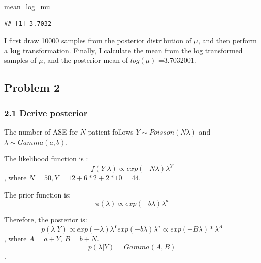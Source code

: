 \documentclass[
]{article}
\newenvironment{Shaded}{\begin{snugshade}}{\end{snugshade}}
\newcommand{\NormalTok}[1]{#1}
\begin{document}
\begin{Shaded}
\begin{Highlighting}[]
\NormalTok{mean_log_mu}
\end{Highlighting}
\end{Shaded}

\begin{verbatim}
## [1] 3.7032
\end{verbatim}

I first draw 10000 samples from the posterior distribution of \(\mu\),
and then perform a \textbf{log} transformation. Finally, I calculate the
mean from the log transformed samples of \(\mu\), and the posterior mean
of \(log(\mu)\) =3.7032001.

\hypertarget{problem-2}{%
\subsection{Problem 2}\label{problem-2}}

\hypertarget{derive-posterior}{%
\subsubsection{2.1 Derive posterior}\label{derive-posterior}}

The number of ASE for \(N\) patient follows
\(Y \sim Poisson(N \lambda)\) and \(\lambda \sim Gamma(a, b)\).

The likelihood function is :
\[f(Y|\lambda) \propto exp(-N \lambda) \lambda^Y\], where
\(N = 50, Y = 12 + 6*2 + 2 * 10 = 44\).

The prior function is:
\[\pi(\lambda) \propto exp(-b \lambda) \lambda^a\]

Therefore, the posterior is:
\[p(\lambda | Y) \propto exp(-\lambda) \lambda^Y exp(-b \lambda) \lambda^a \propto exp(-B \lambda) * \lambda^A\],
where \(A = a + Y\), \(B = b + N\). \[p(\lambda | Y) = Gamma(A, B)\].
\end{document}
